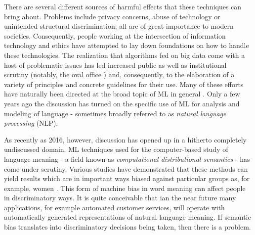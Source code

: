 \documentclass{article}
\begin{document}
There are several different sources of harmful effects that these techniques can bring about. %
Problems include privacy concerns, abuse of technology or unintended structural discrimination; all are of great importance to modern societies. Consequently, people working at the intersection of information technology and ethics have attempted to lay down foundations on how to handle these technologies. The realization that algorithms fed on big data come with a host of problematic issues has led increased public as well as institutional scrutiny (notably, the oval office \cite{united2014big}) and, consequently, to the elaboration of a variety of principles and concrete guidelines for their use. Many of these efforts have naturally been directed at the broad topic of ML in general \cite{leidner2017ethical}. Only a few years ago the discussion has turned on the specific use of ML for analysis and modeling of language - sometimes broadly referred to as \emph{natural language processing} (NLP).

As recently as 2016, however, discussion has opened up in a hitherto completely undiscussed domain. ML techniques used for the computer-based study of language meaning - a field known as \emph{computational distributional semantics} - has come under scrutiny.
Various studies have demonstrated that these methods can  yield results which are in important ways biased against particular groups as, for example, women \cite{bolukbasi2016man}\cite{wagner2015s}.
This form of machine bias in word meaning can affect people in discriminatory ways. It is quite conceivable that ian the near future many applications, for example automated customer services, will operate with automatically generated representations of natural language meaning. If semantic bias translates into discriminatory decisions being taken, then there is a problem.
\end{document}
